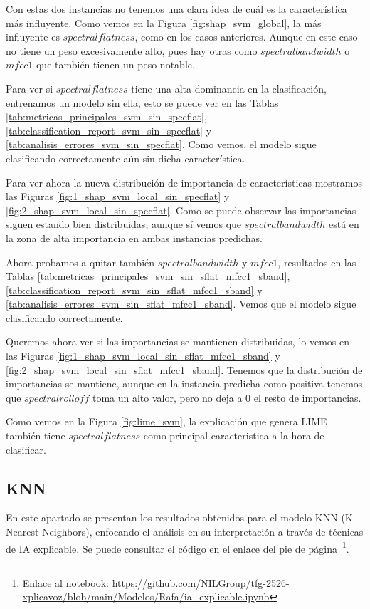Con estas dos instancias no tenemos una clara idea de cuál es la característica más influyente. Como vemos en la Figura \ref{fig:shap_svm_global}, la más influyente es $spectral flatness$, como en los casos anteriores. Aunque en este caso no tiene un peso excesivamente alto, pues hay otras como $spectral bandwidth$ o $mfcc 1$ que también tienen un peso notable.

Para ver si $spectral flatness$ tiene una alta dominancia en la clasificación, entrenamos un modelo sin ella, esto se puede ver en las Tablas \ref{tab:metricas_principales_svm_sin_specflat}, \ref{tab:classification_report_svm_sin_specflat} y \ref{tab:analisis_errores_svm_sin_specflat}. Como vemos, el modelo sigue clasificando correctamente aún sin dicha característica.

Para ver ahora la nueva distribución de importancia de características mostramos las Figuras \ref{fig:1_shap_svm_local_sin_specflat} y \ref{fig:2_shap_svm_local_sin_specflat}. Como se puede observar las importancias siguen estando bien distribuidas, aunque sí vemos que $spectral bandwidth$ está en la zona de alta importancia en ambas instancias predichas.

Ahora probamos a quitar también $spectral bandwidth$ y $mfcc 1$, resultados en las Tablas \ref{tab:metricas_principales_svm_sin_sflat_mfcc1_sband}, \ref{tab:classification_report_svm_sin_sflat_mfcc1_sband} y \ref{tab:analisis_errores_svm_sin_sflat_mfcc1_sband}. Vemos que el modelo sigue clasificando correctamente.

Queremos ahora ver si las importancias se mantienen distribuidas, lo vemos en las Figuras \ref{fig:1_shap_svm_local_sin_sflat_mfcc1_sband} y \ref{fig:2_shap_svm_local_sin_sflat_mfcc1_sband}. Tenemos que la distribución de importancias se mantiene, aunque en la instancia predicha como positiva tenemos que $spectral rolloff$ toma un alto valor, pero no deja a 0 el resto de importancias.

Como vemos en la Figura \ref{fig:lime_svm}, la explicación que genera LIME también tiene $spectral flatness$ como principal caracteristica a la hora de clasificar.

\subsection{KNN}
\label{res_xai_knn}

En este apartado se presentan los resultados obtenidos para el modelo KNN (K-Nearest Neighbors), enfocando el análisis en su interpretación a través de técnicas de IA explicable. Se puede consultar el código en el enlace del pie de página~\footnote{Enlace al notebook: \url{https://github.com/NILGroup/tfg-2526-xplicavoz/blob/main/Modelos/Rafa/ia_explicable.ipynb}}.

